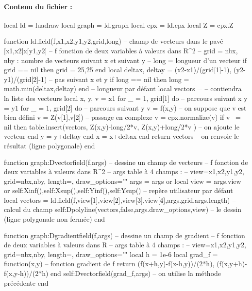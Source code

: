 \paragraph{Contenu du fichier :}
\begin{Luacode}
local ld = luadraw
local graph = ld.graph
local cpx = ld.cpx
local Z = cpx.Z

function ld.field(f,x1,x2,y1,y2,grid,long)
-- champ de vecteurs dans le pavé [x1,x2]x[y1,y2]
-- f fonction de deux variables à valeurs dans R^2
-- grid = {nbx, nby} : nombre de vecteurs suivant x et suivant y
-- long = longueur d'un vecteur
    if grid == nil then grid = {25,25} end
    local deltax, deltay = (x2-x1)/(grid[1]-1), (y2-y1)/(grid[2]-1) -- pas suivant x et y
    if long == nil then long = math.min(deltax,deltay) end -- longueur par défaut
    local vectors = {} -- contiendra la liste des vecteurs
    local x, y, v = x1 
    for _ = 1, grid[1] do -- parcours suivant x
        y = y1
        for _ = 1, grid[2] do -- parcours suivant y
            v = f(x,y) -- on suppose que v est bien défini
            v = Z(v[1],v[2]) -- passage en complexe
            v = cpx.normalize(v)
            if v ~= nil then
                table.insert(vectors, {Z(x,y)-long/2*v, Z(x,y)+long/2*v} ) -- on ajoute le vecteur
            end
            y = y+deltay
        end
        x = x+deltax
    end
    return vectors -- on renvoie le résultat (ligne polygonale)
end

function graph:Dvectorfield(f,args)
-- dessine un champ de vecteurs
-- f fonction de deux variables à valeurs dans R^2
-- args table à 4 champs :
-- { view={x1,x2,y1,y2}, grid={nbx,nby}, length=, draw_options=""}
    args = args or {}
    local view = args.view or {self:Xinf(),self:Xsup(),self:Yinf(),self:Ysup()} -- repère utilisateur par défaut
    local vectors = ld.field(f,view[1],view[2],view[3],view[4],args.grid,args.length) -- calcul du champ
    self:Dpolyline(vectors,false,args.draw_options,view) -- le dessin (ligne polygonale non fermée)
end

function graph:Dgradientfield(f,args)
-- dessine un champ de gradient
-- f fonction de deux variables à valeurs dans R
-- args table à 4 champs :
-- { view={x1,x2,y1,y2}, grid={nbx,nby}, length=, draw_options=""}
    local h = 1e-6
    local grad_f = function(x,y) -- fonction gradient de f
        return { (f(x+h,y)-f(x-h,y))/(2*h), (f(x,y+h)-f(x,y-h))/(2*h) }
    end
    self:Dvectorfield(grad_f,args) -- on utilise la méthode précédente
end
\end{Luacode}

